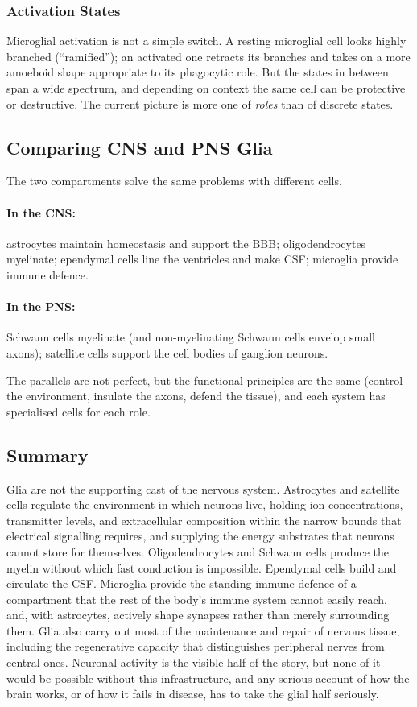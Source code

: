 \documentclass[11pt]{article}
\begin{document}
\subsubsection{Activation States}

Microglial activation is not a simple switch. A resting microglial cell looks highly branched (``ramified''); an activated one retracts its branches and takes on a more amoeboid shape appropriate to its phagocytic role. But the states in between span a wide spectrum, and depending on context the same cell can be protective or destructive. The current picture is more one of \textit{roles} than of discrete states.

\subsection{Comparing CNS and PNS Glia}

The two compartments solve the same problems with different cells.

\paragraph{In the CNS:} astrocytes maintain homeostasis and support the BBB; oligodendrocytes myelinate; ependymal cells line the ventricles and make CSF; microglia provide immune defence.

\paragraph{In the PNS:} Schwann cells myelinate (and non-myelinating Schwann cells envelop small axons); satellite cells support the cell bodies of ganglion neurons.

The parallels are not perfect, but the functional principles are the same (control the environment, insulate the axons, defend the tissue), and each system has specialised cells for each role.

\subsection{Summary}

Glia are not the supporting cast of the nervous system. Astrocytes and satellite cells regulate the environment in which neurons live, holding ion concentrations, transmitter levels, and extracellular composition within the narrow bounds that electrical signalling requires, and supplying the energy substrates that neurons cannot store for themselves. Oligodendrocytes and Schwann cells produce the myelin without which fast conduction is impossible. Ependymal cells build and circulate the CSF. Microglia provide the standing immune defence of a compartment that the rest of the body's immune system cannot easily reach, and, with astrocytes, actively shape synapses rather than merely surrounding them. Glia also carry out most of the maintenance and repair of nervous tissue, including the regenerative capacity that distinguishes peripheral nerves from central ones. Neuronal activity is the visible half of the story, but none of it would be possible without this infrastructure, and any serious account of how the brain works, or of how it fails in disease, has to take the glial half seriously.
\end{document}
